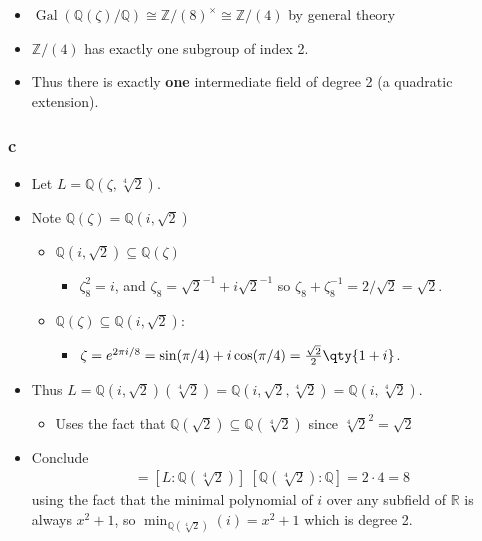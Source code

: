 \begin{solution}
\begin{itemize}
\tightlist
\item
  \(\operatorname{Gal}({\mathbb{Q}}(\zeta)/{\mathbb{Q}}) \cong {\mathbb{Z}}/(8)^{\times}\cong {\mathbb{Z}}/(4)\)
  by general theory
\item
  \({\mathbb{Z}}/(4)\) has exactly one subgroup of index 2.
\item
  Thus there is exactly \textbf{one} intermediate field of degree 2 (a
  quadratic extension).
\end{itemize}

\hypertarget{c-30}{%
\subsubsection{c}\label{c-30}}

\begin{itemize}
\item
  Let \(L = {\mathbb{Q}}(\zeta, \sqrt[4] 2)\).
\item
  Note \({\mathbb{Q}}(\zeta) = {\mathbb{Q}}(i, \sqrt 2)\)

  \begin{itemize}
  \tightlist
  \item
    \({\mathbb{Q}}(i, \sqrt{2})\subseteq {\mathbb{Q}}(\zeta)\)

    \begin{itemize}
    \tightlist
    \item
      \(\zeta_8^2 = i\), and \(\zeta_8 = \sqrt{2}^{-1}+ i\sqrt{2}^{-1}\)
      so \(\zeta_8 + \zeta_8 ^{-1}= 2/\sqrt{2} = \sqrt{2}\).
    \end{itemize}
  \item
    \({\mathbb{Q}}(\zeta) \subseteq {\mathbb{Q}}(i, \sqrt{2})\):

    \begin{itemize}
    \tightlist
    \item
      \(\zeta = e^{2\pi i / 8} = \sin(\pi/4) + i\cos(\pi/4) = {\sqrt 2 \over 2}\qty{1+i}\).
    \end{itemize}
  \end{itemize}
\item
  Thus
  \(L = {\mathbb{Q}}(i, \sqrt{2})(\sqrt[4]{2}) = {\mathbb{Q}}(i, \sqrt 2, \sqrt[4] 2) = {\mathbb{Q}}(i, \sqrt[4]{2})\).

  \begin{itemize}
  \tightlist
  \item
    Uses the fact that
    \({\mathbb{Q}}(\sqrt 2) \subseteq {\mathbb{Q}}(\sqrt[4] 2)\) since
    \(\sqrt[4]{2}^2 = \sqrt{2}\)
  \end{itemize}
\item
  Conclude
  \begin{align*}
  [L: {\mathbb{Q}}] = [L: {\mathbb{Q}}(\sqrt[4] 2)] ~[{\mathbb{Q}}(\sqrt[4] 2): {\mathbb{Q}}] = 2 \cdot 4 = 8
  \end{align*}
  using the fact that the minimal polynomial of \(i\) over any subfield
  of \({\mathbb{R}}\) is always \(x^2 + 1\), so
  \(\min_{{\mathbb{Q}}(\sqrt[4] 2)}(i) = x^2 + 1\) which is degree 2.
\end{itemize}

\end{solution}

